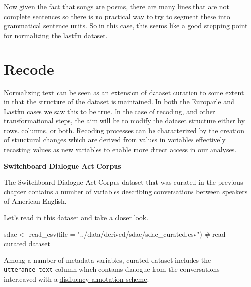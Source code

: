 \documentclass[
  letterpaper,
]{latex/krantz}
\newenvironment{Shaded}{\begin{snugshade}}{\end{snugshade}}
\newcommand{\AttributeTok}[1]{\textcolor[rgb]{0.40,0.45,0.13}{#1}}
\newcommand{\CommentTok}[1]{\textcolor[rgb]{0.37,0.37,0.37}{#1}}
\newcommand{\FunctionTok}[1]{\textcolor[rgb]{0.28,0.35,0.67}{#1}}
\newcommand{\NormalTok}[1]{\textcolor[rgb]{0.00,0.23,0.31}{#1}}
\newcommand{\OtherTok}[1]{\textcolor[rgb]{0.00,0.23,0.31}{#1}}
\newcommand{\StringTok}[1]{\textcolor[rgb]{0.13,0.47,0.30}{#1}}
\begin{document}
Now given the fact that songs are poems, there are many lines that are
not complete sentences so there is no practical way to try to segment
these into grammatical sentence units. So in this case, this seems like
a good stopping point for normalizing the lastfm dataset.

\hypertarget{td-recode}{%
\section{Recode}\label{td-recode}}

Normalizing text can be seen as an extension of dataset curation to some
extent in that the structure of the dataset is maintained. In both the
Europarle and Lastfm cases we saw this to be true. In the case of
recoding, and other transformational steps, the aim will be to modify
the dataset structure either by rows, columns, or both. Recoding
processes can be characterized by the creation of structural changes
which are derived from values in variables effectively recasting values
as new variables to enable more direct access in our analyses.

\textbf{Switchboard Dialogue Act Corpus}

The Switchboard Dialogue Act Corpus dataset that was curated in the
previous chapter contains a number of variables describing conversations
between speakers of American English.

Let's read in this dataset and take a closer look.

\begin{Shaded}
\begin{Highlighting}[]
\NormalTok{sdac }\OtherTok{\textless{}{-}} \FunctionTok{read\_csv}\NormalTok{(}\AttributeTok{file =} \StringTok{"../data/derived/sdac/sdac\_curated.csv"}\NormalTok{) }\CommentTok{\# read curated dataset}
\end{Highlighting}
\end{Shaded}

Among a number of metadata variables, curated dataset includes the
\texttt{utterance\_text} column which contains dialogue from the
conversations interleaved with a
\href{https://staff.fnwi.uva.nl/r.fernandezrovira/teaching/DM-materials/DFL-book.pdf}{disfluency
annotation scheme}.
\end{document}
